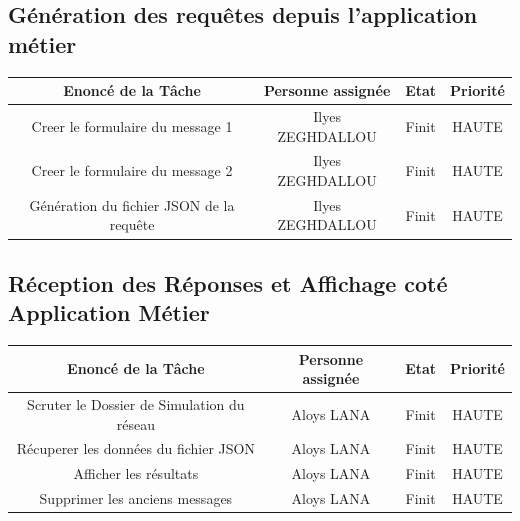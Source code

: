 \documentclass[a4paper, 11pt]{article}
\begin{document}
    \subsection{Génération des requêtes depuis l'application métier}
    \begin{center}
    \begin{tabular}{|c|c|c|c|}
        \hline
        Enoncé de la Tâche & Personne assignée & Etat & Priorité\\
        \hline
        \hline
        Creer le formulaire du message 1  & Ilyes ZEGHDALLOU & Finit & HAUTE \\
        \hline
        Creer le formulaire du message 2  & Ilyes ZEGHDALLOU & Finit & HAUTE \\
        \hline
        Génération du fichier JSON de la requête  & Ilyes ZEGHDALLOU & Finit & HAUTE \\
        \hline
    \end{tabular}
    \end{center}

    \subsection{Réception des Réponses et Affichage coté Application Métier}
    \begin{center}
    \begin{tabular}{|c|c|c|c|}
        \hline
        Enoncé de la Tâche & Personne assignée & Etat & Priorité\\
        \hline
        \hline
        Scruter le Dossier de Simulation du réseau  & Aloys LANA & Finit & HAUTE \\
        \hline
        Récuperer les données du fichier JSON  & Aloys LANA & Finit & HAUTE \\
        \hline
        Afficher les résultats  & Aloys LANA & Finit & HAUTE \\
        \hline
        Supprimer les anciens messages  & Aloys LANA & Finit & HAUTE \\
        \hline
    \end{tabular}
    \end{center}
\end{document}
